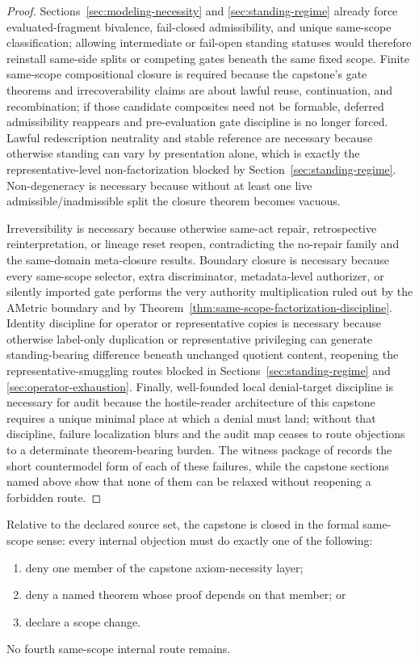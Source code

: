 \begin{proof}
Sections~\ref{sec:modeling-necessity} and \ref{sec:standing-regime} already force evaluated-fragment bivalence, fail-closed admissibility, and unique same-scope classification; allowing intermediate or fail-open standing statuses would therefore reinstall same-side splits or competing gates beneath the same fixed scope. Finite same-scope compositional closure is required because the capstone's gate theorems and irrecoverability claims are about lawful reuse, continuation, and recombination; if those candidate composites need not be formable, deferred admissibility reappears and pre-evaluation gate discipline is no longer forced. Lawful redescription neutrality and stable reference are necessary because otherwise standing can vary by presentation alone, which is exactly the representative-level non-factorization blocked by Section~\ref{sec:standing-regime}. Non-degeneracy is necessary because without at least one live admissible/inadmissible split the closure theorem becomes vacuous.

Irreversibility is necessary because otherwise same-act repair, retrospective reinterpretation, or lineage reset reopen, contradicting the no-repair family and the same-domain meta-closure results. Boundary closure is necessary because every same-scope selector, extra discriminator, metadata-level authorizer, or silently imported gate performs the very authority multiplication ruled out by the AMetric boundary and by Theorem~\ref{thm:same-scope-factorization-discipline}. Identity discipline for operator or representative copies is necessary because otherwise label-only duplication or representative privileging can generate standing-bearing difference beneath unchanged quotient content, reopening the representative-smuggling routes blocked in Sections~\ref{sec:standing-regime} and \ref{sec:operator-exhaustion}. Finally, well-founded local denial-target discipline is necessary for audit because the hostile-reader architecture of this capstone requires a unique minimal place at which a denial must land; without that discipline, failure localization blurs and the audit map ceases to route objections to a determinate theorem-bearing burden. The witness package of \exhaustiondoc{} records the short countermodel form of each of these failures, while the capstone sections named above show that none of them can be relaxed without reopening a forbidden route.
\end{proof}

\begin{corollary}
\label{cor:formal-closed-system-seal}
Relative to the declared source set, the capstone is closed in the formal same-scope sense: every internal objection must do exactly one of the following:
\begin{enumerate}
  \item deny one member of the capstone axiom-necessity layer;
  \item deny a named theorem whose proof depends on that member; or
  \item declare a scope change.
\end{enumerate}
No fourth same-scope internal route remains.
\end{corollary}

